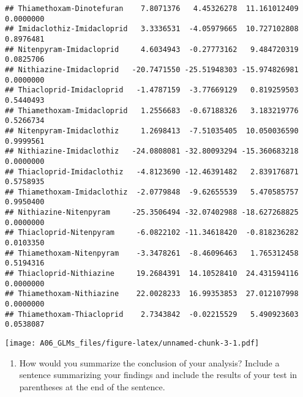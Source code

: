 \documentclass[]{article}
\newenvironment{Shaded}{\begin{snugshade}}{\end{snugshade}}
\newcommand{\KeywordTok}[1]{\textcolor[rgb]{0.13,0.29,0.53}{\textbf{#1}}}
\newcommand{\DataTypeTok}[1]{\textcolor[rgb]{0.13,0.29,0.53}{#1}}
\newcommand{\DecValTok}[1]{\textcolor[rgb]{0.00,0.00,0.81}{#1}}
\newcommand{\StringTok}[1]{\textcolor[rgb]{0.31,0.60,0.02}{#1}}
\newcommand{\CommentTok}[1]{\textcolor[rgb]{0.56,0.35,0.01}{\textit{#1}}}
\newcommand{\OperatorTok}[1]{\textcolor[rgb]{0.81,0.36,0.00}{\textbf{#1}}}
\newcommand{\NormalTok}[1]{#1}
\providecommand{\tightlist}{%
  \setlength{\itemsep}{0pt}\setlength{\parskip}{0pt}}
\begin{document}
\begin{verbatim}
## Thiamethoxam-Dinotefuran    7.8071376   4.45326278  11.161012409 0.0000000
## Imidaclothiz-Imidacloprid   3.3336531  -4.05979665  10.727102808 0.8976481
## Nitenpyram-Imidacloprid     4.6034943  -0.27773162   9.484720319 0.0825706
## Nithiazine-Imidacloprid   -20.7471550 -25.51948303 -15.974826981 0.0000000
## Thiacloprid-Imidacloprid   -1.4787159  -3.77669129   0.819259503 0.5440493
## Thiamethoxam-Imidacloprid   1.2556683  -0.67188326   3.183219776 0.5266734
## Nitenpyram-Imidaclothiz     1.2698413  -7.51035405  10.050036590 0.9999561
## Nithiazine-Imidaclothiz   -24.0808081 -32.80093294 -15.360683218 0.0000000
## Thiacloprid-Imidaclothiz   -4.8123690 -12.46391482   2.839176871 0.5758935
## Thiamethoxam-Imidaclothiz  -2.0779848  -9.62655539   5.470585757 0.9950400
## Nithiazine-Nitenpyram     -25.3506494 -32.07402988 -18.627268825 0.0000000
## Thiacloprid-Nitenpyram     -6.0822102 -11.34618420  -0.818236282 0.0103350
## Thiamethoxam-Nitenpyram    -3.3478261  -8.46096463   1.765312458 0.5194316
## Thiacloprid-Nithiazine     19.2684391  14.10528410  24.431594116 0.0000000
## Thiamethoxam-Nithiazine    22.0028233  16.99353853  27.012107998 0.0000000
## Thiamethoxam-Thiacloprid    2.7343842  -0.02215529   5.490923603 0.0538087
\end{verbatim}

\begin{Shaded}
\end{Shaded}

\texttt{[image: A06\_GLMs\_files/figure-latex/unnamed-chunk-3-1.pdf]}

\begin{enumerate}
\def\labelenumi{\arabic{enumi}.}
\setcounter{enumi}{8}
\tightlist
\item
  How would you summarize the conclusion of your analysis? Include a
  sentence summarizing your findings and include the results of your
  test in parentheses at the end of the sentence.
\end{enumerate}
\end{document}
